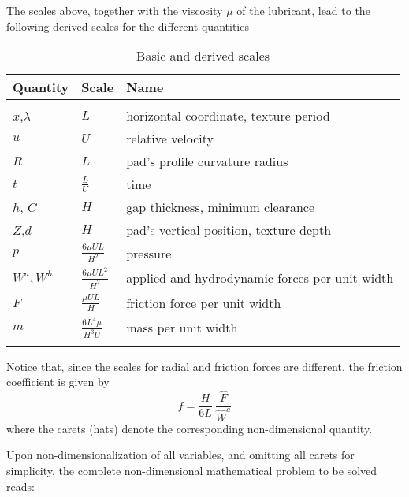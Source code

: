 The scales above, together with the viscosity $\mu$ of the lubricant,
lead to the following derived scales for the different
quantities

\begin{table}[htb]
\begin{center} \caption{Basic and derived scales}
\vspace{0.3cm}
\begin{tabular}{|l|l|l|}
\hline
Quantity & Scale & Name\\ \hline
& & \\
$x$,$\lambda$ & ${L}$ & horizontal coordinate, texture period\\
$u$ & ${U}$ & relative velocity\\
$R$ & ${L}$ & pad's profile curvature radius\\
$t$ & $\frac{L}{U}$ & time\\
$h$, $C$ & $H$ & gap thickness, minimum clearance\\
$Z$,$d$ & $H$ & pad's vertical position, texture depth\\
$p$ & $\frac{6\mu U L}{H^2}$ & pressure\\
$W^{a}, W^h$ & $\frac{6\mu U L^2}{H^2}$ & applied and hydrodynamic forces per unit width\\
$F$ & $\frac{\mu U L}{H}$ & friction force per unit width\\
$m$ & $\frac{6 L^4 \mu}{H^3 U}$ & mass per unit width \\ & & \\\hline
\end{tabular}
\end{center}
\end{table}

Notice that, since the scales for radial and friction forces
are different, the friction coefficient is given by
\begin{equation}
f = \frac{H}{6L}~\frac{\hat{F}}{\hat{W}^{a}}
\end{equation}
where the carets (hats) denote the corresponding non-dimensional
quantity.

Upon non-dimensionalization of all variables, and 
omitting all carets for simplicity, 
the complete non-dimensional mathematical
problem to be solved reads:

